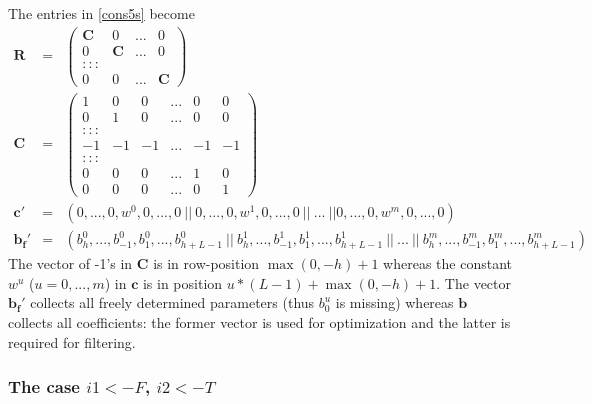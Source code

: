 \documentclass[a4paper]{book}
\begin{document}
The entries in \ref{cons5s} become
\begin{eqnarray}
\mathbf{R}&=&\left(\begin{array}{cccc}
\mathbf{C}&0&...&0\\
0&\mathbf{C}&...&0\\
:::\\
0&0&...&\mathbf{C}
\end{array}\right)\label{app1}\\
\mathbf{C}&=&\left(\begin{array}{cccccc}
1&0&0&...&0&0\\
0&1&0&...&0&0\\
:::\\
-1&-1&-1&...&-1&-1\\
:::\\
0&0&0&...&1&0\\
0&0&0&...&0&1
\end{array}\right)\label{app2}\\
\mathbf{c}'&=&(0,...,0,w^0,0,...,0~||~0,...,0,w^1,0,...,0~||~...~||0,...,0,w^m,0,...,0)\nonumber\\
\mathbf{b_f}'&=&(b_{h}^0,...,b_{-1}^0,b_1^0,...,b_{h+L-1}^0~||~b_{h}^1,...,b_{-1}^1,b_1^1,...,b_{h+L-1}^1~||~...~||~b_{h}^m,...,b_{-1}^m,b_1^m,...,b_{h+L-1}^m)\nonumber
\end{eqnarray}
The vector of -1's in $\mathbf{C}$ is in row-position $\max(0,-h)+1$ whereas the constant $w^u$ ($u=0,...,m$) in $\mathbf{c}$ is in position $u*(L-1)+\max(0,-h)+1$. The vector $\mathbf{b_f'}$ collects all freely determined parameters (thus $b_0^u$ is missing) whereas $\mathbf{b}$ collects all coefficients: the former vector is used for optimization and the latter is required for filtering. 




\subsubsection{The case $i1<-F$, $i2<-T$}
\end{document}
